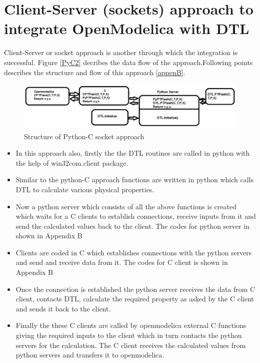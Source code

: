 \documentclass[12pt]{report}
\begin{document}
\section{Client-Server (sockets) approach to integrate OpenModelica with DTL}
Client-Server or socket approach is another through which the integration is successful. Figure \ref{PyC2} decribes the data flow of the approach.Following points describes the structure and flow of this approach \ref{appenB}.

\begin{figure}
\centering
\includegraphics[width=1\linewidth]{PytC2}
\caption{Structure of Python-C socket approach}
\label{fig:PyC2}
\end{figure}

\begin{itemize}
\item{In this approach also, firstly the the DTL routines are called in python with the help of win32com.client package.}
\item{Similar to the python-C approach functions are written in python which calls DTL to calculate various physical properties.}
\item{Now a python server which consists of all the above functions is created which waits for a C clients to establish connections, receive inputs from it and send the calculated values back to the client. The codes for python server in shown in Appendix B}
\item{Clients are coded in C which establishes connections with the python servers and send and receive data from it. The codes for C client is shown in Appendix B}
\item{Once the connection is established the python server receives the data from C client, contacts DTL, calculate the required property as asked by the C client and sends it back to the client.}
\item{Finally the these C clients are called by openmodelica external C functions giving the required inputs to the client which in turn contacts the python servers for the calculation. The C client receives the calculated values from python servers and transfers it to openmodelica.}
\end{itemize}
\end{document}
